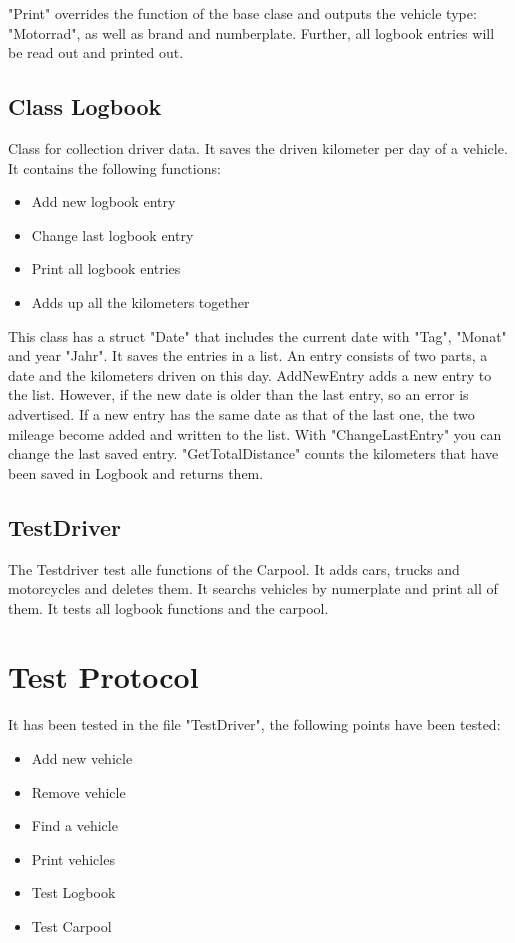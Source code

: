 "Print" overrides the function of the base clase and outputs the vehicle type: "Motorrad", as well as brand and numberplate.
Further, all logbook entries will be read out and printed out.

\subsection{Class Logbook}
Class for collection driver data. It saves the driven kilometer per day of a vehicle.
It contains the following functions:
\begin{itemize}
	\item Add new logbook entry
	\item Change last logbook entry
	\item Print all logbook entries
	\item Adds up all the kilometers together
\end{itemize}

This class has a struct "Date" that includes the current date with "Tag", "Monat" and year "Jahr". It saves the entries in a list. An entry consists of two parts, a date and the kilometers driven on this day. AddNewEntry adds a new entry to the list. However, if the new date is older than the last entry, so an error is advertised. If a new entry has the same date as that of the last one, the two mileage become added and written to the list. With "ChangeLastEntry" you can change the last saved entry. "GetTotalDistance" counts the kilometers that have been saved in Logbook and returns them.

\subsection{TestDriver}
The Testdriver test alle functions of the Carpool. It adds cars, trucks and motorcycles and deletes them.
It searchs vehicles by numerplate and print all of them. It tests all logbook functions and the carpool.

\section{Test Protocol}
It has been tested in the file "TestDriver", the following points have been tested:
\begin{itemize}
	\item Add new vehicle
	\item Remove vehicle
	\item Find a vehicle
	\item Print vehicles
	\item Test Logbook
	\item Test Carpool
\end{itemize}

